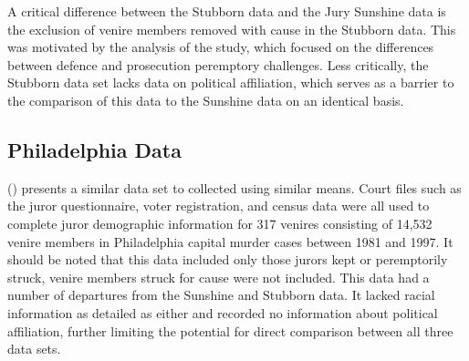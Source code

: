 A critical difference between the Stubborn data and the Jury Sunshine data is the exclusion of venire members removed with cause in the Stubborn data. This was motivated by the analysis of the study, which focused on the differences between defence and prosecution peremptory challenges. Less critically, the Stubborn data set lacks data on political affiliation, which serves as a barrier to the comparison of this data to the Sunshine data on an identical basis.

\subsection{Philadelphia Data} \label{sec:phillydata}

(\cite{PerempChalMurder}) presents a similar data set to \cite{StubbornLegacy} collected using similar means. Court files such as
the juror questionnaire, voter registration, and census data were all used to complete juror demographic information for 317
venires consisting of 14,532 venire members in Philadelphia capital murder cases between 1981 and 1997. It should be noted that this data included only those
jurors kept or peremptorily struck, venire members struck for cause were not included. This data had a number of departures from the Sunshine and Stubborn data. It lacked racial information as detailed as either and recorded no information about political affiliation, further limiting the potential for direct comparison between all three data sets.
